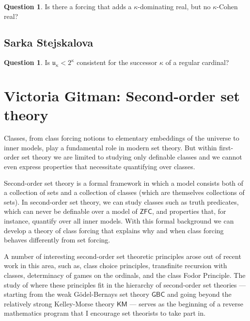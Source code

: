 \documentclass{amsart}
\theoremstyle{definition}
\newtheorem{question}[theorem]{Question}
\newcommand{\ZFC}{\mathsf{ZFC}}
\newcommand{\GBC}{\mathsf{GBC}}
\newcommand{\KM}{\mathsf{KM}}
\begin{document}
\begin{question} 
Is there a forcing that adds a $\kappa$-dominating real, but no $\kappa$-Cohen real? 
\end{question} 


\subsection{Sarka Stejskalova} 


\begin{question} 
Is $\mathfrak{u}_\kappa<2^\kappa$ consistent for the successor $\kappa$ of a regular cardinal? 
\end{question} 







\iffalse 
\newpage 
\section{Victoria Gitman: Second-order set theory}

Classes, from class forcing notions to elementary embeddings of the universe to inner models, play a fundamental role in modern set theory. But within first-order set theory we are limited to studying only definable classes and we cannot even express properties that necessitate quantifying over classes. 

Second-order set theory is a formal framework in which a model consists both of a collection of sets and a collection of classes (which are themselves collections of sets). In second-order set theory, we can study classes such as truth predicates, which can never be definable over a model of $\ZFC$, and properties that, for instance, quantify over all inner models. With this formal background we can develop a theory of class forcing that explains why and when class forcing behaves differently from set forcing. 


A number of interesting second-order set theoretic principles arose out of recent work in this area, such as, class choice principles, transfinite recursion with classes, determinacy of games on the ordinals, and the class Fodor Principle. The study of where these principles fit in the hierarchy of second-order set theories --- starting from the weak G\"odel-Bernays set theory $\GBC$ and going beyond the relatively strong Kelley-Morse theory $\KM$ --- serves as the beginning of a reverse mathematics program that I encourage set theorists to take part in.
\end{document}
